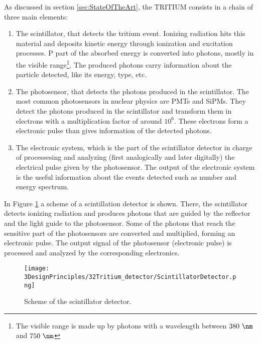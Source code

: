 As discussed in section \ref{sec:StateOfTheArt}, the TRITIUM consists in a chain of three main elements:

\begin{enumerate}

\item{} The scintillator, that detects the tritium event. Ionizing radiation hits this material and deposits kinetic energy through ionization and excitation processes. P part of the absorbed energy is converted into photons, mostly in the visible range\footnote{The visible range is made up by photons with a wavelength between $380~\nm$ and $750~\nm$}. The produced photons carry information about the particle detected, like its energy, type, etc.

\item{} The photosensor, that detects the photons produced in the scintillator. The most common photosensors in nuclear physics are PMTs and SiPMs. They detect the photons produced in the scintillator and transform them in electrons with a multiplication factor of around $10^6$. These electrons form a electronic pulse than gives information of the detected photons.

\item{} The electronic system, which is the part of the scintillator detector in charge of processesing and analyzing (first analogically and later digitally) the electrical pulse given by the photosensor. The output of the electronic system is the useful information about the events detected such as number and energy spectrum.

\end{enumerate}

In Figure \ref{fig:ScintillatorDetector} a scheme of a scintillation detector is shown. There, the scintillator detects ionizing radiation and produces photons that are guided by the reflector and the light guide to the photosensor. Some of the photons that reach the sensitive part of the photosensors are converted and multiplied, forming an electronic pulse. The output signal of the photosensor (electronic pulse) is processed and analyzed by the corresponding electronics.

\begin{figure}[hbtp]
\texttt{[image: 3DesignPrinciples/32Tritium\_detector/ScintillatorDetector.png]}
\centering
\caption{Scheme of the scintillator detector.\label{fig:ScintillatorDetector}}
\end{figure}
